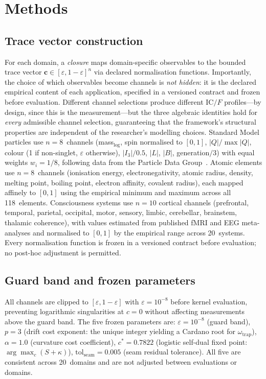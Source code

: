 \documentclass[
  aps,
  prx,
  twocolumn,
  superscriptaddress,
  nofootinbib,
  floatfix
]{revtex4-2}
\newcommand{\eps}{\varepsilon}
\newcommand{\IC}{\mathrm{IC}}
\newcommand{\tvec}{\mathbf{c}}
\begin{document}
\section{Methods}

\subsection{Trace vector construction}

For each domain, a \emph{closure} maps domain-specific observables to
the bounded trace vector $\tvec \in [\eps, 1{-}\eps]^n$ via declared
normalisation functions. Importantly, the choice of which
observables become channels is \emph{not hidden}: it is the declared
empirical content of each application, specified in a versioned
contract and frozen before evaluation. Different channel selections
produce different $\IC/F$ profiles---by design, since this is the
measurement---but the three algebraic identities hold for
\emph{every} admissible channel selection, guaranteeing that the
framework's structural properties are independent of the
researcher's modelling choices. Standard Model particles use $n = 8$~channels
(mass$_{\log}$, spin normalised to $[0,1]$,
$|Q|/\max|Q|$, colour (1 if non-singlet, $\eps$ otherwise),
$|I_3|/0.5$, $|L|$, $|B|$, generation$/3$) with equal weights
$w_i = 1/8$, following data from the Particle Data
Group~\cite{pdg2024}. Atomic elements use $n = 8$~channels
(ionisation energy, electronegativity, atomic radius, density,
melting point, boiling point, electron affinity, covalent radius),
each mapped affinely to $[0, 1]$ using the empirical minimum and
maximum across all 118~elements. Consciousness systems use $n = 10$
cortical channels (prefrontal, temporal, parietal, occipital, motor,
sensory, limbic, cerebellar, brainstem, thalamic coherence),
with values estimated from published fMRI and EEG meta-analyses and
normalised to $[0, 1]$ by the empirical range across 20~systems.
Every normalisation function is
frozen in a versioned contract before evaluation; no post-hoc
adjustment is permitted.

\subsection{Guard band and frozen parameters}

All channels are clipped to $[\eps, 1{-}\eps]$ with
$\eps = 10^{-8}$ before kernel evaluation, preventing logarithmic
singularities at $c = 0$ without affecting measurements above the
guard band. The five frozen parameters are:
$\eps = 10^{-8}$ (guard band),
$p = 3$ (drift cost exponent: the unique integer yielding a Cardano
root for $\omega_{\mathrm{trap}}$),
$\alpha = 1.0$ (curvature cost coefficient),
$c^* = 0.7822$ (logistic self-dual fixed point: $\arg\max_c (S + \kappa)$),
$\mathrm{tol}_{\mathrm{seam}} = 0.005$ (seam residual tolerance).
All five are consistent across 20~domains and are not adjusted between
evaluations or domains.
\end{document}
